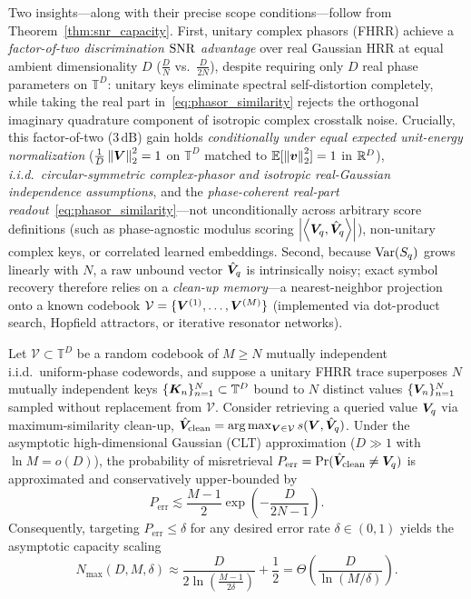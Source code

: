 Two insights---along with their precise scope conditions---follow from Theorem~\ref{thm:snr_capacity}.
First, unitary complex phasors (FHRR) achieve a \emph{factor-of-two discrimination $\mathrm{SNR}$ advantage} over real Gaussian HRR at equal ambient dimensionality $D$ ($\frac{D}{N}$ vs.\ $\frac{D}{2N}$), despite requiring only $D$ real phase parameters on $\mathbb{T}^D$: unitary keys eliminate spectral self-distortion completely, while taking the real part in~\eqref{eq:phasor_similarity} rejects the orthogonal imaginary quadrature component of isotropic complex crosstalk noise.
Crucially, this factor-of-two ($3\,\mathrm{dB}$) gain holds \emph{conditionally under equal expected unit-energy normalization} ($\frac{1}{D}\left\lVert \boldsymbol{V} \right\rVert_2^2 = 1$ on $\mathbb{T}^D$ matched to $\mathbb{E}[\left\lVert \boldsymbol{v} \right\rVert_2^2] = 1$ in $\mathbb{R}^D$), \emph{i.i.d.\ circular-symmetric complex-phasor and isotropic real-Gaussian independence assumptions}, and the \emph{phase-coherent real-part readout}~\eqref{eq:phasor_similarity}---not unconditionally across arbitrary score definitions (such as phase-agnostic modulus scoring $\left\lvert \left\langle \boldsymbol{V}_q, \hat{\boldsymbol{V}}_q \right\rangle \right\rvert$), non-unitary complex keys, or correlated learned embeddings.
Second, because $\operatorname{Var}(S_q)$ grows linearly with $N$, a raw unbound vector $\hat{\boldsymbol{V}}_q$ is intrinsically noisy; exact symbol recovery therefore relies on a \emph{clean-up memory}---a nearest-neighbor projection onto a known codebook $\mathcal{V} = \{\boldsymbol{V}^{(1)}, \dots, \boldsymbol{V}^{(M)}\}$ (implemented via dot-product search, Hopfield attractors, or iterative resonator networks).

\begin{corollary}\label{cor:cleanup_capacity}
Let $\mathcal{V} \subset \mathbb{T}^D$ be a random codebook of $M \ge N$ mutually independent i.i.d.\ uniform-phase codewords, and suppose a unitary FHRR trace superposes $N$ mutually independent keys $\{\boldsymbol{K}_n\}_{n=1}^N \subset \mathbb{T}^D$ bound to $N$ distinct values $\{\boldsymbol{V}_n\}_{n=1}^N$ sampled without replacement from $\mathcal{V}$.
Consider retrieving a queried value $\boldsymbol{V}_q$ via maximum-similarity clean-up, $\hat{\boldsymbol{V}}_{\mathrm{clean}} = \arg\max_{\boldsymbol{V} \in \mathcal{V}} s(\boldsymbol{V}, \hat{\boldsymbol{V}}_q)$.
Under the asymptotic high-dimensional Gaussian (CLT) approximation ($D \gg 1$ with $\ln M = o(D)$), the probability of misretrieval $P_{\mathrm{err}} = \Pr(\hat{\boldsymbol{V}}_{\mathrm{clean}} \neq \boldsymbol{V}_q)$ is approximated and conservatively upper-bounded by
\begin{equation}\label{eq:perr_bound}
    P_{\mathrm{err}} \lesssim \frac{M - 1}{2} \exp\!\left(-\frac{D}{2N - 1}\right).
\end{equation}
Consequently, targeting $P_{\mathrm{err}} \le \delta$ for any desired error rate $\delta \in (0, 1)$ yields the asymptotic capacity scaling
\begin{equation}\label{eq:capacity_bound}
    N_{\max}(D, M, \delta) \approx \frac{D}{2 \ln\!\left(\frac{M - 1}{2\delta}\right)} + \frac{1}{2}
    = \Theta\!\left(\frac{D}{\ln(M / \delta)}\right).
\end{equation}
\end{corollary}

